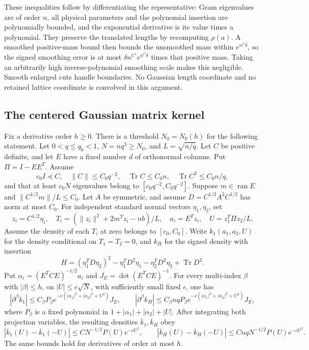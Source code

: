 These inequalities follow by differentiating the representative:
Gram eigenvalues are of order $n$, all physical parameters and
the polynomial insertion are polynomially bounded, and the
exponential derivative is its value times a polynomial. They
preserve the translated lengths by recomputing $\rho(a)$.
A smoothed positive-mass bound then bounds the unsmoothed mass
within $e^{n^C\delta}$, so the signed smoothing error is at most
$\delta n^{C'}e^{n^C\delta}$ times that positive mass.
Taking an arbitrarily high inverse-polynomial smoothing scale
makes this negligible. Smooth enlarged cuts handle boundaries.
No Gaussian length coordinate and no retained lattice coordinate
is convolved in this argument.

\subsection{The centered Gaussian matrix kernel}



\begin{lemma}\label{prof:gaussian-signed-kernel}
Fix a derivative order $h\ge0$. There is a threshold $N_0=N_0(h)$
for the following statement. Let $0<q\le q_0<1$,
$N=nq^3\ge N_0$, and $L=\sqrt{n/q}$.
Let $C$ be positive definite, and let $E$ have a fixed number $d$ of
orthonormal columns. Put $\Pi=I-EE^T$. Assume
\[
 c_0I\preceq C,\quad \|C\|\le C_0q^{-2},\quad
 \operatorname{Tr}C\le C_0n,\quad \operatorname{Tr}C^2\le C_0n/q,
\]
and that at least $c_0N$ eigenvalues belong to
$[c_0q^{-2},C_0q^{-2}]$. Suppose $m\in\operatorname{ran}E$ and
$\|C^{1/2}m\|/L\le C_0$. Let $A$ be symmetric, and assume
$D=C^{1/2}A^2C^{1/2}$ has norm at most $C_0$.
For independent standard normal vectors $\eta_1,\eta_2$, set
\[
 z_i=C^{1/2}\eta_i,\quad
 T_i=(\|z_i\|^2+2m^Tz_i-nb)/L,\quad
 a_i=E^Tz_i,\quad U=z_1^T\Pi z_2/L.
\]
Assume the density of each $T_i$ at zero belongs to $[c_0,C_0]$.
Write $k_1(a_1,a_2,U)$ for the density conditional on $T_1=T_2=0$,
and $k_H$ for the signed density with insertion
\[
 H=(\eta_1^TD\eta_2)^2-\eta_1^TD^2\eta_1
       -\eta_2^TD^2\eta_2+\operatorname{Tr}D^2.
\]
Put $\alpha_i=(E^TCE)^{-1/2}a_i$ and $J_E=\det(E^TCE)^{-1}$.
For every multi-index $\beta$ with $|\beta|\le h$, on $|U|\le\epsilon\sqrt N$,
with sufficiently small fixed $\epsilon$, one has
\[
 |\partial^\beta k_1|\le C_\beta P_\beta
 e^{-c(|\alpha_1|^2+|\alpha_2|^2+U^2)}J_E,\qquad
 |\partial^\beta k_H|\le C_\beta nq P_\beta
 e^{-c(|\alpha_1|^2+|\alpha_2|^2+U^2)}J_E,
\]
where $P_\beta$ is a fixed polynomial in
$1+|\alpha_1|+|\alpha_2|+|U|$.
After integrating both projection variables, the resulting densities
$\overline k_1,\overline k_H$ obey
\[
 |\overline k_1(U)-\overline k_1(-U)|
 \le CN^{-1/2}P(U)e^{-cU^2},\qquad
 |\overline k_H(U)-\overline k_H(-U)|
 \le CnqN^{-1/2}P(U)e^{-cU^2}.
\]
The same bounds hold for derivatives of order at most $h$.
\end{lemma}

